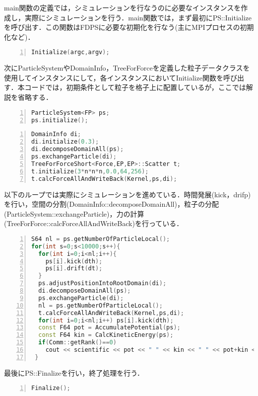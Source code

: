 \documentclass[twocolumn,10pt]{jarticle}
\begin{document}
main関数の定義では，シミュレーションを行なうのに必要なインスタンスを作成し，実際にシミュレーションを行う．main関数では，まず最初にPS::Initializeを呼び出す．この関数はFDPSに必要な初期化を行なう(主にMPIプロセスの初期化など)．
 \begin{lstlisting}[language=c++,numbers=left,numbersep=5pt,frame=single,basicstyle=\ttfamily]
Initialize(argc,argv);
\end{lstlisting}
 次にParticleSystemやDomainInfo，TreeForForceを定義した粒子データクラスを使用してインスタンスにして，各インスタンスにおいてInitialize関数を呼び出す．本コードでは，初期条件として粒子を格子上に配置しているが，ここでは解説を省略する．
\begin{lstlisting}[language=c++,numbers=left,numbersep=5pt,frame=single,basicstyle=\ttfamily]
ParticleSystem<FP> ps;
ps.initialize();
\end{lstlisting}
\begin{lstlisting}[language=c++,numbers=left,numbersep=5pt,frame=single,basicstyle=\ttfamily]
DomainInfo di;
di.initialize(0.3);
di.decomposeDomainAll(ps);
ps.exchangeParticle(di);
TreeForForceShort<Force,EP,EP>::Scatter t;
t.initialize(3*n*n*n,0.0,64,256);
t.calcForceAllAndWriteBack(Kernel,ps,di);
\end{lstlisting}
以下のループでは実際にシミュレーションを進めている．時間発展(kick，drifp)を行い，空間の分割(DomainInfo::decomposeDomainAll)，粒子の分配(ParticleSystem::exchangeParticle)，力の計算(TreeForForce::calcForceAllAndWriteBack)を行っている．
\begin{lstlisting}[language=c++,numbers=left,numbersep=5pt,frame=single,basicstyle=\ttfamily]
S64 nl = ps.getNumberOfParticleLocal();
for(int s=0;s<10000;s++){
  for(int i=0;i<nl;i++){
    ps[i].kick(dth);
    ps[i].drift(dt);
  }
  ps.adjustPositionIntoRootDomain(di);
  di.decomposeDomainAll(ps);
  ps.exchangeParticle(di);
  nl = ps.getNumberOfParticleLocal();
  t.calcForceAllAndWriteBack(Kernel,ps,di);
  for(int i=0;i<nl;i++) ps[i].kick(dth);
  const F64 pot = AccumulatePotential(ps);
  const F64 kin = CalcKineticEnergy(ps);
  if(Comm::getRank()==0)
    cout << scientific << pot << " " << kin << " " << pot+kin << endl;
 }
\end{lstlisting}
最後にPS::Finalizeを行い，終了処理を行う．
\begin{lstlisting}[language=c++,numbers=left,numbersep=5pt,frame=single,basicstyle=\ttfamily]
Finalize();
\end{lstlisting}
\end{document}
